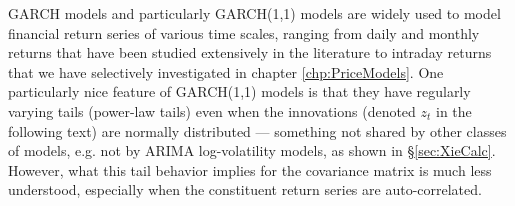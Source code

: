 \documentclass{report}
\begin{document}

GARCH models and particularly GARCH(1,1) models are widely used to
model financial return series of various time scales, ranging from
daily and monthly returns that have been studied extensively in the
literature to intraday returns that we have selectively investigated
in chapter \ref{chp:PriceModels}. One particularly nice feature of
GARCH(1,1) models is that they have regularly varying tails (power-law
tails) \cite{Mikosch2009, mikosch2000} even when the innovations
(denoted $z_t$ in the following text) are normally distributed ---
something not shared by other classes of models, e.g. not by ARIMA
log-volatility models, as shown in \S\ref{sec:XieCalc}. However, what
this tail behavior implies for the covariance matrix is much less
understood, especially when the constituent return series are
auto-correlated.
\end{document}
